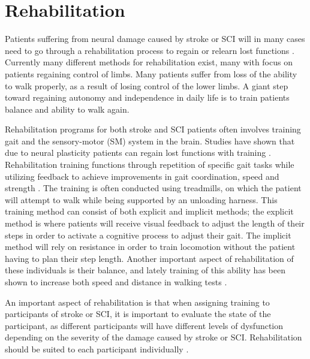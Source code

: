 \section{Rehabilitation}

Patients suffering from neural damage caused by stroke or SCI will in many cases need to go through a rehabilitation process to regain or relearn lost functions \cite{Sandrini2018, Michael2005}. Currently many different methods for rehabilitation exist, many with focus on patients regaining control of limbs. Many patients suffer from loss of the ability to walk properly, as a result of losing control of the lower limbs. A giant step toward regaining autonomy and independence in daily life is to train patients balance and ability to walk again.

Rehabilitation programs for both stroke and SCI patients often involves training gait and the sensory-motor (SM) system in the brain. Studies have shown that due to neural plasticity patients can regain lost functions with training \cite{Belda2011, Sandrini2018, Kaupp2018}. %
Rehabilitation training functions through repetition of specific gait tasks while utilizing feedback to achieve improvements in gait coordination, speed and strength \cite{Belda2011}. The training is often conducted using treadmills, on which the patient will attempt to walk while being supported by an unloading harness. This training method can consist of both explicit and implicit methods; the explicit method is where patients will receive visual feedback to adjust the length of their steps in order to activate a cognitive process to adjust their gait. The implicit method will rely on resistance in order to train locomotion without the patient having to plan their step length. Another important aspect of rehabilitation of these individuals is their balance, and lately training of this ability has been shown to increase both speed and distance in walking tests \cite{Sandrini2018}.

An important aspect of rehabilitation is that when assigning training to participants of stroke or SCI, it is important to evaluate the state of the participant, as different participants will have different levels of dysfunction depending on the severity of the damage caused by stroke or SCI. Rehabilitation should be suited to each participant individually \cite{Sandrini2018,Zehr2011}.


